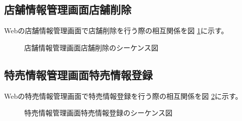 \documentclass[a4j]{jarticle}
\begin{document}
\subsection{店舗情報管理画面店舗削除}
Webの店舗情報管理画面で店舗削除を行う際の相互関係を図 \ref {tab:oonishi4}に示す。
\begin{figure}[H]
\begin{center}
\caption{店舗情報管理画面店舗削除のシーケンス図}
\label{tab:oonishi4}
\end{center}
\end{figure}

\subsection{特売情報管理画面特売情報登録}
Webの特売情報管理画面で特売情報登録を行う際の相互関係を図 \ref {tab:oonishi21}に示す。
\begin{figure}[H]
\begin{center}
\caption{特売情報管理画面特売情報登録のシーケンス図}
\label{tab:oonishi21}
\end{center}
\end{figure}
\end{document}
